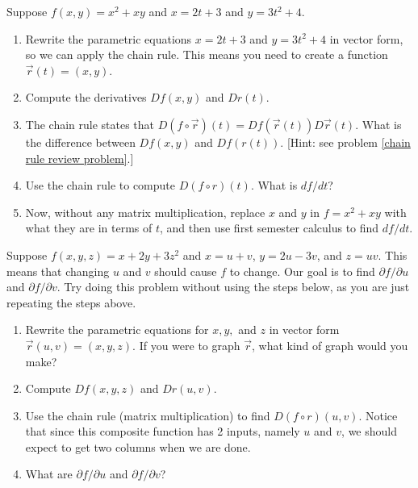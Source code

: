\begin{problem}%
 Suppose $f(x,y) = x^2+xy$ and $x=2t+3$ and $y=3t^2+4$.
 \begin{enumerate}
  \item Rewrite the parametric equations $x=2t+3$ and $y=3t^2+4$ in vector form, so we can apply the chain rule. This means you need to create a function $\vec r(t) = (x,y)$.
  \item Compute the derivatives $Df(x,y)$ and $Dr(t)$. 
  \item The chain rule states that $D(f\circ \vec r)(t) = Df(\vec r(t))D\vec r(t)$. What is the difference between $Df(x,y)$ and $Df(r(t))$. [Hint: see problem \ref{chain rule review problem}.]
  \item Use the chain rule to compute $D(f\circ r)(t)$. What is $df/dt$?
  \item Now, without any matrix multiplication, replace $x$ and $y$ in $f=x^2+xy$ with what they are in terms of $t$, and then use first semester calculus to find $df/dt$.
 \end{enumerate}
\end{problem}

\begin{problem}%
 Suppose $f(x,y,z) = x+2y+3z^2$ and $x=u+v$, $y=2u-3v$, and $z=uv$.  This means that changing $u$ and $v$ should cause $f$ to change. Our goal is to find $\partial f/\partial u$ and $\partial f/\partial v$. Try doing this problem without using the steps below, as you are just repeating the steps above.
 \begin{enumerate}
  \item Rewrite the parametric equations for $x,y,$ and $z$ in vector form $\vec r(u,v)=(x,y,z)$. If you were to graph $\vec r$, what kind of graph would you make?
  \item Compute $Df(x,y,z)$ and $Dr(u,v)$.  
  \item Use the chain rule (matrix multiplication) to find $D(f\circ r)(u,v)$.  Notice that since this composite function has 2 inputs, namely $u$ and $v$, we should expect to get two columns when we are done.
  \item What are $\partial f/\partial u$ and $\partial f/\partial v$? 
 \end{enumerate}
\end{problem}

